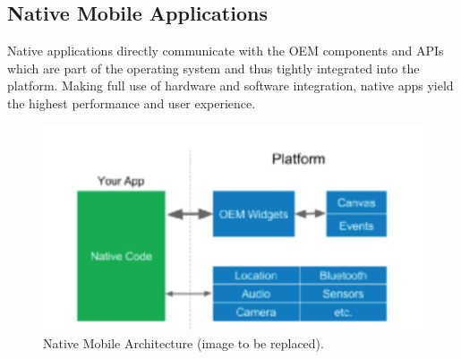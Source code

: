 \subsection{Native Mobile Applications}
Native applications directly communicate with the OEM components and APIs which are part of the operating system and thus tightly integrated into the platform.
Making full use of hardware and software integration, native apps yield the highest performance and user experience.

\begin{figure}
    \includegraphics[width=\linewidth]{images/architectures/native_architecture.png}
    \caption{Native Mobile Architecture (image to be replaced).}
    \label{fig:native_architecture}
\end{figure}

